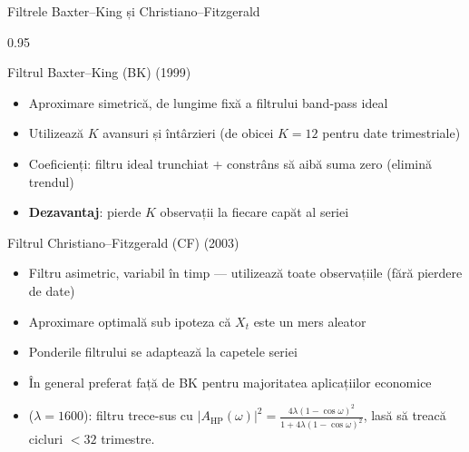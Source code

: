 \documentclass[9pt, aspectratio=169, t]{beamer}
\begin{document}
\begin{frame}{Filtrele Baxter--King și Christiano--Fitzgerald}
    \begin{cminipage}{0.95\textwidth}
    \vspace{-2mm}
    \begin{block}{Filtrul Baxter--King (BK) (1999)}
        {\small
        \begin{itemize}\setlength{\itemsep}{0pt}
            \item Aproximare simetrică, de lungime fixă a filtrului band-pass ideal
            \item Utilizează $K$ avansuri și întârzieri (de obicei $K = 12$ pentru date trimestriale)
            \item Coeficienți: filtru ideal trunchiat + constrâns să aibă suma zero (elimină trendul)
            \item \textbf{Dezavantaj}: pierde $K$ observații la fiecare capăt al seriei
        \end{itemize}
        }
    \end{block}
    \vspace{-2mm}
    \begin{exampleblock}{Filtrul Christiano--Fitzgerald (CF) (2003)}
        {\small
        \begin{itemize}\setlength{\itemsep}{0pt}
            \item Filtru asimetric, variabil în timp --- utilizează toate observațiile (fără pierdere de date)
            \item Aproximare optimală sub ipoteza că $X_t$ este un mers aleator
            \item Ponderile filtrului se adaptează la capetele seriei
            \item În general preferat față de BK pentru majoritatea aplicațiilor economice
        \end{itemize}
        }
    \end{exampleblock}
    \vspace{1mm}
    \begin{itemize}\setlength{\itemsep}{0pt}
        \item[\textbf{Filtrul HP}:] ($\lambda=1600$): filtru trece-sus cu $|A_{\text{HP}}(\omega)|^2 = \frac{4\lambda(1 - \cos\omega)^2}{1 + 4\lambda(1 - \cos\omega)^2}$, lasă să treacă cicluri $< 32$ trimestre.
    \end{itemize}
    \end{cminipage}
\end{frame}
\end{document}
